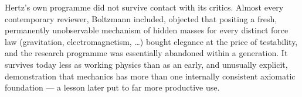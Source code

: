 Hertz's own programme did not survive contact with its critics.
Almost every contemporary reviewer, Boltzmann included, objected
that positing a fresh, permanently unobservable mechanism of hidden
masses for every distinct force law (gravitation, electromagnetism,
\ldots) bought elegance at the price of testability, and the
research programme was essentially abandoned within a generation. It
survives today less as working physics than as an early, and
unusually explicit, demonstration that mechanics has more than one
internally consistent axiomatic foundation --- a lesson later put to
far more productive use.
